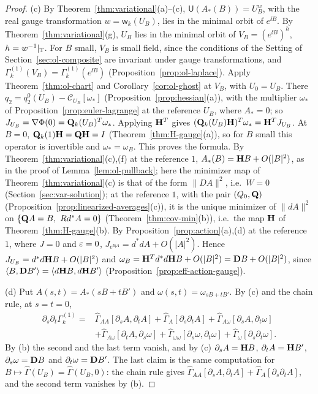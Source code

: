 \begin{proof}
(c) By Theorem~\ref{thm:variational}(a)--(c), $\mathsf U(A_*(B))=U_B^{w}$, with the real gauge transformation $w=\mathsf w_k(U_B)$, lies in the minimal orbit of $e^{\ii B}$. By Theorem~\ref{thm:variational}(g), $U_B$ lies in the minimal orbit of $V_B=(e^{\ii B})^{h}$, $h=w^{-1}|_\mathbb T$. For $B$ small, $V_B$ is small field, since the conditions of the Setting of Section~\ref{sec:ol-composite} are invariant under gauge transformations, and $\Gamma^{(1)}_k(V_B)=\Gamma^{(1)}_k(e^{\ii B})$ (Proposition~\ref{prop:ol-laplace}). Apply Theorem~\ref{thm:ol-chart} and Corollary~\ref{cor:ol-ghost} at $V_B$, with $U_0=U_B$. There $q_2=q_2^0(U_B)-\mathcal C_{U_B}[\omega_*]$ (Proposition~\ref{prop:hessian}(a)), with the multiplier $\omega_*$ of Proposition~\ref{prop:euler-lagrange} at the reference $U_B$, where $A_*=0$; so $J_{U_B}=\nabla\Phi(0)=\mathbf Q_k(U_B)^T\omega_*$. Applying $\mathbf H^T$ gives $(\mathbf Q_k(U_B)\mathbf H)^T\omega_*=\mathbf H^TJ_{U_B}$. At $B=0$, $\mathbf Q_k(1)\mathbf H=\mathbf Q\mathbf H=I$ (Theorem~\ref{thm:H-gauge}(a)), so for $B$ small this operator is invertible and $\omega_*=\omega_B$. This proves the formula. By Theorem~\ref{thm:variational}(c),(f) at the reference $1$, $A_*(B)=\mathbf H B+O(|B|^2)$, as in the proof of Lemma~\ref{lem:ol-pullback}; here the minimizer map of Theorem~\ref{thm:variational}(c) is that of the form $\|DA\|^2$, i.e.\ $W=0$ (Section~\ref{sec:var-solution}); at the reference $1$, with the pair $(Q_0,\mathbf Q)$ (Proposition~\ref{prop:linearized-averages}(c)), it is the unique minimizer of $\|dA\|^2$ on $\{\mathbf Q A=B,\ Rd^*A=0\}$ (Theorem~\ref{thm:cov-min}(b)), i.e.\ the map $\mathbf H$ of Theorem~\ref{thm:H-gauge}(b). By Proposition~\ref{prop:action}(a),(d) at the reference $1$, where $J=0$ and $\varepsilon=0$, $J_{e^{\ii\eta A}}=d^*dA+O(|A|^2)$. Hence $J_{U_B}=d^*d\mathbf H B+O(|B|^2)$ and $\omega_B=\mathbf H^Td^*d\mathbf H B+O(|B|^2)=\mathbf D B+O(|B|^2)$, since $\langle B,\mathbf D B'\rangle=\langle d\mathbf H B,d\mathbf H B'\rangle$ (Proposition~\ref{prop:eff-action-gauge}).

(d) Put $A(s,t)=A_*(sB+tB')$ and $\omega(s,t)=\omega_{sB+tB'}$. By (c) and the chain rule, at $s=t=0$,
\[
\begin{aligned}
\partial_s\partial_t\Gamma^{(1)}_k={}&\widehat\Gamma_{AA}[\partial_sA,\partial_tA]+\widehat\Gamma_A[\partial_s\partial_tA]+\widehat\Gamma_{A\omega}[\partial_sA,\partial_t\omega]\\
&+\widehat\Gamma_{A\omega}[\partial_tA,\partial_s\omega]+\widehat\Gamma_{\omega\omega}[\partial_s\omega,\partial_t\omega]+\widehat\Gamma_\omega[\partial_s\partial_t\omega].
\end{aligned}
\]
By (b) the second and the last term vanish, and by (c) $\partial_sA=\mathbf H B$, $\partial_tA=\mathbf H B'$, $\partial_s\omega=\mathbf D B$ and $\partial_t\omega=\mathbf D B'$. The last claim is the same computation for $B\mapsto\widehat\Gamma(U_B)=\widehat\Gamma(U_B,0)$: the chain rule gives $\widehat\Gamma_{AA}[\partial_sA,\partial_tA]+\widehat\Gamma_A[\partial_s\partial_tA]$, and the second term vanishes by (b).
\end{proof}

